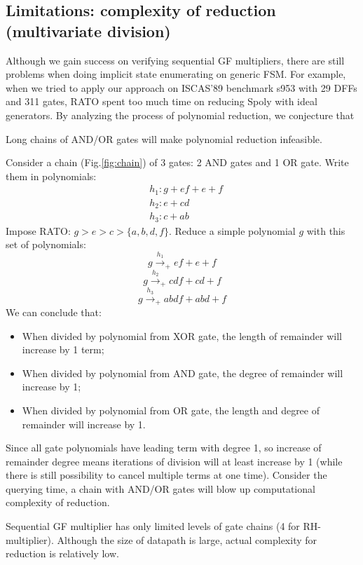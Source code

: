 \subsection{Limitations: complexity of reduction (multivariate division)}
Although we gain success on verifying sequential GF multipliers, there are still problems when
doing implicit state enumerating on generic FSM. For example, when we tried to apply our approach
on ISCAS'89 benchmark s953 with 29 DFFs and 311 gates, RATO spent too much time on reducing
Spoly with ideal generators. By analyzing the process of polynomial reduction, we conjecture that
\begin{Conjecture}
Long chains of AND/OR gates will make polynomial reduction infeasible.
\end{Conjecture}

\begin{figure}[hbt]
\end{figure}

\begin{Example}
Consider a chain (Fig.\ref{fig:chain}) of 3 gates: 2 AND gates and 1 OR gate. Write them in polynomials:
\begin{align*}
&h_1:g+ef+e+f\\
&h_2:e+cd\\
&h_3:c+ab
\end{align*}
Impose RATO: $g>e>c>\{a,b,d,f\}$. Reduce a simple polynomial $g$ with this set of polynomials:
$$g\xrightarrow{h_1}_{+} ef+e+f$$
$$g\xrightarrow{h_2}_{+} cdf+cd+f$$
$$g\xrightarrow{h_3}_{+} abdf+abd+f$$
We can conclude that:
\begin{itemize}
\item When divided by polynomial from XOR gate, the length of remainder will increase by 1 term;\\
\item When divided by polynomial from AND gate, the degree of remainder will increase by 1;\\
\item When divided by polynomial from OR gate, the length and degree of remainder will increase by 1.
\end{itemize}
Since all gate polynomials have leading term with degree 1, so increase of remainder degree means
iterations of division will at least increase by 1 (while there is still possibility to cancel multiple terms
at one time). Consider the querying time, a chain with AND/OR gates will blow up computational complexity of
reduction.

Sequential GF multiplier has only limited levels of gate chains (4 for RH-multiplier). Although the size of 
datapath is large, actual complexity for reduction is relatively low.
\end{Example}

